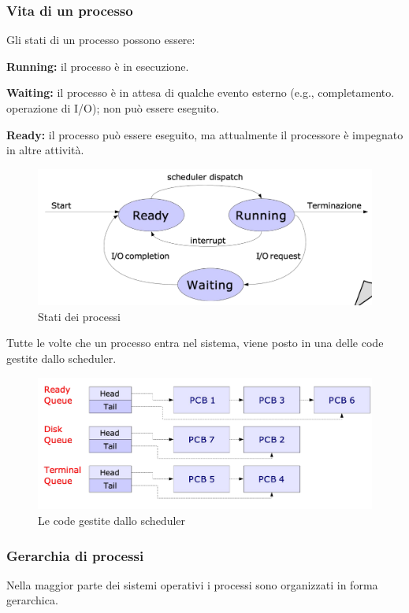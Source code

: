 \subsubsection{Vita di un processo}
Gli stati di un processo possono essere:
\newline

\textbf{Running:} il processo è in esecuzione.

\textbf{Waiting:} il processo è in attesa di qualche evento esterno (e.g., completamento.
operazione di I/O); non può essere eseguito.

\textbf{Ready:} il processo può essere eseguito, ma attualmente il processore è impegnato in altre attività.

\begin{figure} [h]
    \centering
    \includegraphics[width=0.6\linewidth]{Images/Screenshot 2024-12-23 at 12-34-55 so-02.1-scheduling - so-02.1-scheduling.pdf.png}
    \caption{Stati dei processi}
\end{figure}

Tutte le volte che un processo entra nel sistema, viene posto in una delle code gestite dallo scheduler.

\begin{figure} [h]
    \centering
    \includegraphics[width=0.6\linewidth]{Images/Screenshot 2024-12-23 at 12-37-44 so-02.1-scheduling - so-02.1-scheduling.pdf.png}
    \caption{Le code gestite dallo scheduler}
\end{figure}

\subsubsection{Gerarchia di processi}
Nella maggior parte dei sistemi operativi i processi sono organizzati in forma gerarchica.

